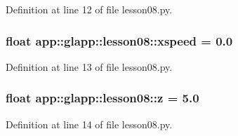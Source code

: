 Definition at line 12 of file lesson08.py.
\subsubsection{\setlength{\rightskip}{0pt plus 5cm}float {\bf app::glapp::lesson08::xspeed} = 0.0\hspace{0.3cm}{\tt  [static]}}\label{namespaceapp_1_1glapp_1_1lesson08_70605448d056b8bc146ee5a8c29a0a7e}




Definition at line 13 of file lesson08.py.
\subsubsection{\setlength{\rightskip}{0pt plus 5cm}float {\bf app::glapp::lesson08::z} = 5.0\hspace{0.3cm}{\tt  [static]}}\label{namespaceapp_1_1glapp_1_1lesson08_2f1f91828a5106a95de763e14772a23d}




Definition at line 14 of file lesson08.py.